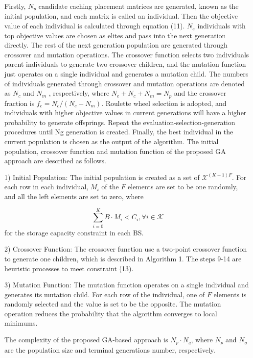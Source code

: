 \documentclass[conference]{IEEEtran}
\begin{document}
Firstly, $N_p$ candidate caching placement matrices are generated, known as the initial population, and each matrix is called an individual. Then the objective value of each individual is calculated through equation (11). $N_e$ individuals with top objective values are chosen as elites and pass into the next generation directly. The rest of the next generation population are generated through crossover and mutation operations. The crossover function selects two individuals parent individuals to generate two crossover children, and the mutation function just operates on a single individual and generates a mutation child. The numbers of individuals generated through crossover and mutation operations are denoted as $N_c$ and $N_m$ , respectively, where $N_e+N_c+N_m=N_p$ and the crossover fraction is $f_c=N_c/ (N_c+N_m)$. Roulette wheel selection is adopted, and individuals with higher objective values in current generations will have a higher probability to generate offsprings. Repeat the evaluation-selection-generation procedures until Ng generation is created. Finally, the best individual in the current population is chosen as the output of the algorithm. The initial population, crossover function and mutation function of the proposed GA approach are described as follows.

1)	Initial Population: The initial population is created as a set of $\mathcal{X}^{(K+1)F}$. For each row in each individual, $M_i$ of the $F$ elements are set to be one randomly, and all the left elements are set to zero, where

\begin{equation}
\sum_{i=0}^K B\cdot M_i <C_i, \forall{i}\in\mathcal{K}
\end{equation}
for the storage capacity constraint in each BS.

2)	Crossover Function: The crossover function use a two-point crossover function to generate one children, which is described in Algorithm 1. The steps 9-14 are heuristic processes to meet constraint (13).

3)	Mutation Function: The mutation function operates on a single individual and generates its mutation child. For each row of the individual, one of $F$ elements is randomly selected and the value is set to be the opposite. The mutation operation reduces the probability that the algorithm converges to local minimums.

The complexity of the proposed GA-based approach is $N_p\cdot N_g$, where $ N_p$ and $N_g$ are the population size and terminal generations number, respectively.
\end{document}
